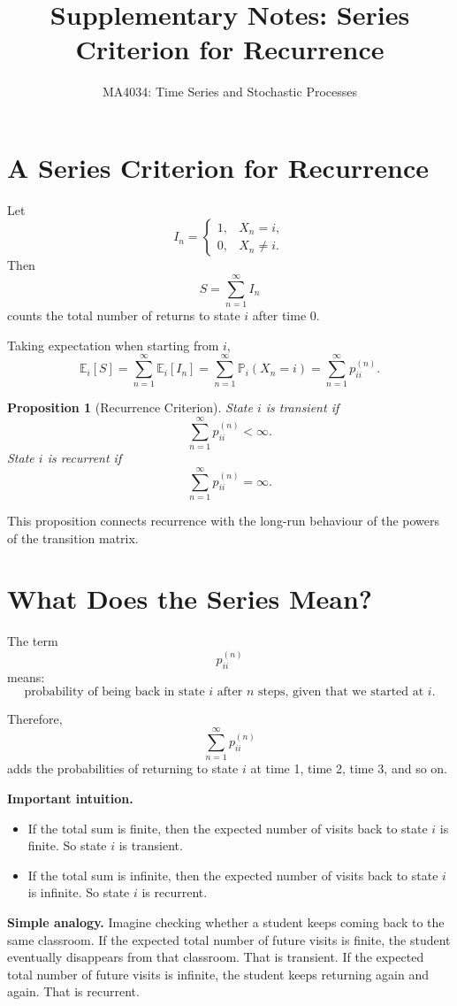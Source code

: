 \documentclass[12pt,a4paper]{article}
\title{\textbf{Supplementary Notes: Series Criterion for Recurrence}}
\author{MA4034: Time Series and Stochastic Processes}
\date{}
\theoremstyle{notestyle}
\newtheorem{proposition}{Proposition}
\newcommand{\Prob}{\mathbb{P}}
\newcommand{\E}{\mathbb{E}}
\begin{document}
\maketitle

\section{A Series Criterion for Recurrence}

Let
\[
I_n=
\begin{cases}
1, & X_n=i,\\
0, & X_n\neq i.
\end{cases}
\]
Then
\[
S=\sum_{n=1}^{\infty}I_n
\]
counts the total number of returns to state $i$ after time 0.

Taking expectation when starting from $i$,
\[
\E_i[S]
=
\sum_{n=1}^{\infty}\E_i[I_n]
=
\sum_{n=1}^{\infty}\Prob_i(X_n=i)
=
\sum_{n=1}^{\infty}p_{ii}^{(n)}.
\]

\begin{proposition}[Recurrence Criterion]
State $i$ is transient if
\[
\sum_{n=1}^{\infty}p_{ii}^{(n)}<\infty.
\]
State $i$ is recurrent if
\[
\sum_{n=1}^{\infty}p_{ii}^{(n)}=\infty.
\]
\end{proposition}

This proposition connects recurrence with the long-run behaviour of the powers of the transition matrix.

\section{What Does the Series Mean?}

The term
\[
p_{ii}^{(n)}
\]
means:
\[
\text{probability of being back in state }i\text{ after }n\text{ steps, given that we started at }i.
\]

Therefore,
\[
\sum_{n=1}^{\infty}p_{ii}^{(n)}
\]
adds the probabilities of returning to state $i$ at time 1, time 2, time 3, and so on.

\textbf{Important intuition.}
\begin{itemize}[leftmargin=1.2cm]
    \item If the total sum is finite, then the expected number of visits back to state $i$ is finite. So state $i$ is transient.
    \item If the total sum is infinite, then the expected number of visits back to state $i$ is infinite. So state $i$ is recurrent.
\end{itemize}

\textbf{Simple analogy.} Imagine checking whether a student keeps coming back to the same classroom. If the expected total number of future visits is finite, the student eventually disappears from that classroom. That is transient. If the expected total number of future visits is infinite, the student keeps returning again and again. That is recurrent.
\end{document}
